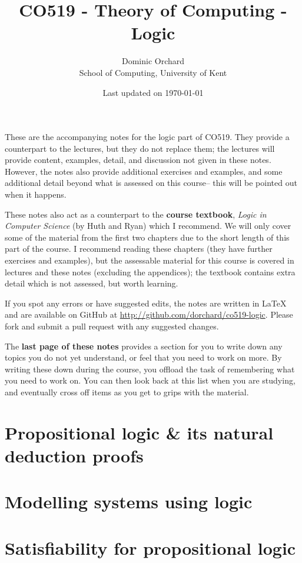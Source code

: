 \documentclass[a4paper]{article}
\title{\vspace{-3em}CO519 - Theory of Computing - Logic}
\author{Dominic Orchard \\
  {\small{School of Computing, University of Kent}}}
\date{Last updated on \today}
\theoremstyle{definition}
\begin{document}
\maketitle

\noindent
These are the accompanying notes for the logic part of CO519. They
provide a counterpart to the lectures, but they do not replace them; the
lectures will provide content, examples, detail, and discussion not given in
these notes.  However, the notes also provide additional exercises and
examples, and some additional detail beyond what is assessed on this
course-- this will be pointed out when it happens.

These notes also act as a counterpart to the \textbf{course textbook},
\emph{Logic in Computer Science} (by Huth and Ryan) which I
recommend. We will only cover some of the material from the first two
chapters due to the short length of this part of the course. I
recommend reading these chapters (they have further exercises and
examples), but the assessable material for this course is covered in
lectures and these notes (excluding the appendices); the textbook
contains extra detail which is not assessed, but worth learning.

If you spot any errors or have suggested edits, the notes are written
in LaTeX and are available on GitHub at
\url{http://github.com/dorchard/co519-logic}. Please fork and submit a
pull request with any suggested changes.

The \textbf{last page of these notes} provides a section for you to
write down any topics you do not yet understand, or feel that you need
to work on more. By writing these down during the course, you offload
the task of remembering what you need to work on. You can then look
back at this list when you are studying, and eventually cross off items
as you get to grips with the material.

\part{Propositional logic \& its natural deduction proofs}


\part{Modelling systems using logic}
\setcounter{section}{0}


\part{Satisfiability for propositional logic}
\setcounter{section}{0}

\end{document}
